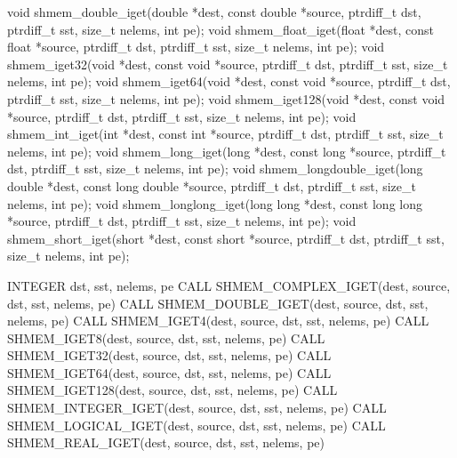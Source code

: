 \label{subsec:shmem_iget}
\synC   %

void shmem_double_iget(double *dest, const double *source, ptrdiff_t dst, ptrdiff_t sst, size_t nelems, int pe);
void shmem_float_iget(float *dest, const float *source, ptrdiff_t dst, ptrdiff_t sst, size_t nelems, int pe);
void shmem_iget32(void *dest, const void *source, ptrdiff_t dst, ptrdiff_t sst, size_t nelems, int pe);
void shmem_iget64(void *dest, const void *source, ptrdiff_t dst, ptrdiff_t sst, size_t nelems, int pe);
void shmem_iget128(void *dest, const void *source, ptrdiff_t  dst, ptrdiff_t sst, size_t nelems, int pe);
void shmem_int_iget(int *dest, const int *source, ptrdiff_t dst, ptrdiff_t sst, size_t nelems, int pe);
void shmem_long_iget(long *dest, const  long  *source,  ptrdiff_t dst, ptrdiff_t sst, size_t nelems, int pe);
void shmem_longdouble_iget(long double *dest, const long double *source, ptrdiff_t dst, ptrdiff_t sst, size_t nelems, int pe);
void shmem_longlong_iget(long long *dest, const long long *source, ptrdiff_t dst, ptrdiff_t sst, size_t nelems, int pe);
void shmem_short_iget(short *dest, const short *source, ptrdiff_t dst, ptrdiff_t sst, size_t nelems, int pe); %
\synF   %

INTEGER dst, sst, nelems, pe
CALL SHMEM_COMPLEX_IGET(dest, source, dst, sst, nelems, pe)
CALL SHMEM_DOUBLE_IGET(dest, source, dst, sst, nelems, pe)
CALL SHMEM_IGET4(dest, source, dst, sst, nelems, pe)
CALL SHMEM_IGET8(dest, source, dst, sst, nelems, pe)
CALL SHMEM_IGET32(dest, source, dst, sst, nelems, pe)
CALL SHMEM_IGET64(dest, source, dst, sst, nelems, pe)
CALL SHMEM_IGET128(dest, source, dst, sst, nelems, pe)
CALL SHMEM_INTEGER_IGET(dest, source, dst, sst, nelems, pe)
CALL SHMEM_LOGICAL_IGET(dest, source, dst, sst, nelems, pe)
CALL SHMEM_REAL_IGET(dest, source, dst, sst, nelems, pe) %

